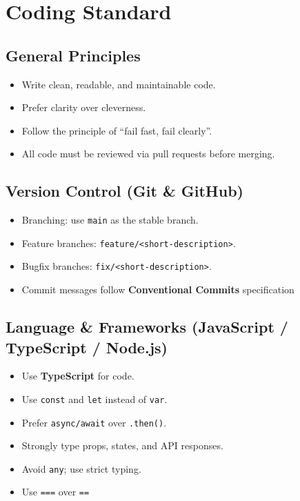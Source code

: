 \documentclass{article}
\begin{document}
\section{Coding Standard}

\subsection*{General Principles}
\begin{itemize}
  \item Write clean, readable, and maintainable code.
  \item Prefer clarity over cleverness.
  \item Follow the principle of ``fail fast, fail clearly''.
  \item All code must be reviewed via pull requests before merging.
\end{itemize}

\subsection*{Version Control (Git \& GitHub)}
\begin{itemize}
  \item Branching: use \texttt{main} as the stable branch.
  \item Feature branches: \texttt{feature/<short-description>}.
  \item Bugfix branches: \texttt{fix/<short-description>}.
  \item Commit messages follow \textbf{Conventional Commits} specification
\end{itemize}

\subsection*{Language \& Frameworks (JavaScript / TypeScript / Node.js)}
\begin{itemize}
  \item Use \textbf{TypeScript} for code.
  \item Use \texttt{const} and \texttt{let} instead of \texttt{var}.
  \item Prefer \texttt{async/await} over \texttt{.then()}.
  \item Strongly type props, states, and API responses.
  \item Avoid \texttt{any}; use strict typing.
  \item Use \texttt{===} over \texttt{==}
\end{itemize}
\end{document}

